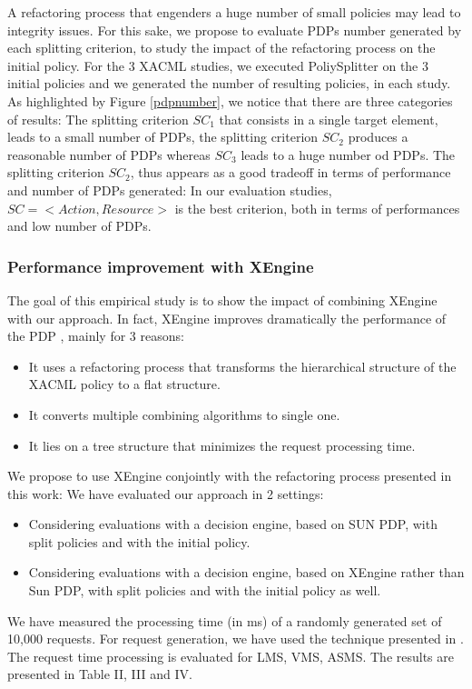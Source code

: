 A refactoring process that engenders a huge number of small policies may lead to integrity issues. For this sake, 
we propose to evaluate PDPs number generated by each splitting criterion, to study the impact of the refactoring process on the initial policy. 
For the 3 XACML studies, we executed PoliySplitter on the 3 initial policies and we generated the number of resulting policies, in each study. 
As highlighted by Figure \ref{pdpnumber}, we notice that there are three
 categories of results: The splitting criterion $SC_{1}$ that consists in a single target element, 
leads to a small number of PDPs, the splitting criterion $SC_{2}$ produces a reasonable number of PDPs whereas $SC_{3}$ leads to a huge 
number od PDPs. The splitting criterion $SC_{2}$, thus appears as a good tradeoff in terms of performance and number of 
PDPs generated: In our evaluation studies, $SC=<Action, Resource>$ is the best criterion, both in terms of performances and low number of PDPs.

\subsubsection{Performance improvement with XEngine}
The goal of this empirical study is to show the impact of combining XEngine with our approach. In fact, XEngine improves dramatically 
the performance of the PDP \cite{Xengine}, mainly for 3 reasons:

\begin{itemize}
\item It uses a refactoring process that transforms the hierarchical structure of the XACML policy to a flat structure. 
\item It converts multiple combining algorithms to single one.
\item It lies on a tree structure that minimizes the request processing time.
\end{itemize}
We propose to use XEngine conjointly with the refactoring process presented in this work:
We have evaluated our approach in 2 settings:
\begin{itemize}
\item Considering evaluations with a decision engine, based on SUN PDP, with split policies and with the initial policy.  
\item Considering evaluations with a decision engine, based on XEngine rather than Sun PDP, with split policies and with the initial policy as well.  
\end{itemize}
We have measured the processing time (in ms) of a randomly generated set of 10,000 requests. For request generation, we have used the technique presented 
in \cite{request}. The request time processing is evaluated for LMS, VMS, ASMS. The results are presented in Table II, III and IV.




